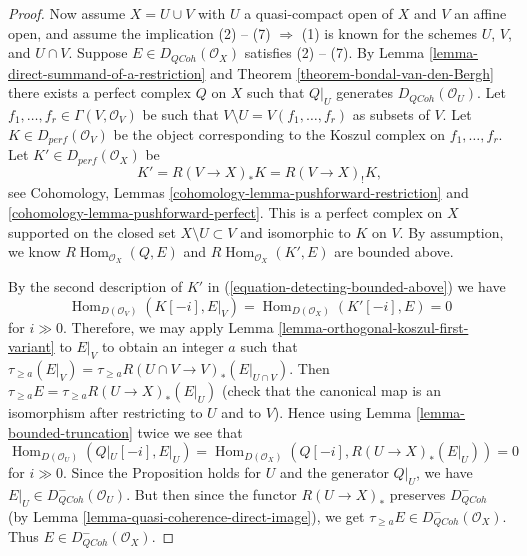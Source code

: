 \documentclass{amsart}
\theoremstyle{plain}
\theoremstyle{definition}
\theoremstyle{remark}
\numberwithin{equation}{subsection}
\def\Hom{\mathop{\mathrm{Hom}}\nolimits}
\def\QCoh{\mathit{QCoh}}
\begin{document}
\begin{proof}
\medskip\noindent
Now assume $X = U \cup V$ with $U$ a quasi-compact open of $X$ and
$V$ an affine open, and assume the implication (2) -- (7) $\Rightarrow$ (1)
is known for the schemes $U$, $V$, and $U \cap V$.
Suppose $E \in D_\QCoh(\mathcal{O}_X)$ satisfies (2) -- (7).
By Lemma \ref{lemma-direct-summand-of-a-restriction} and
Theorem \ref{theorem-bondal-van-den-Bergh} there exists a perfect
complex $Q$ on $X$ such that $Q|_U$ generates $D_\QCoh (\mathcal{O}_U)$. 
Let $f_1, \dots , f_r \in \Gamma (V, \mathcal{O}_V)$
be such that $V \setminus U = V(f_1, \dots , f_r)$ as subsets of
$V$. Let $K \in D_{perf}(\mathcal{O}_V)$ be the object
corresponding to the Koszul complex on $f_1, \dots , f_r$.
Let $K' \in D_{perf}(\mathcal{O}_X)$ be
\begin{equation}
\label{equation-detecting-bounded-above}
K' = R (V \to X)_* K = R (V \to X)_! K,
\end{equation}
see Cohomology, Lemmas \ref{cohomology-lemma-pushforward-restriction} and
\ref{cohomology-lemma-pushforward-perfect}. This is a perfect
complex on $X$ supported on the closed set $X \setminus U \subset V$
and isomorphic to $K$ on $V$. By assumption, we know
$R\Hom_{\mathcal{O}_X}(Q, E)$ and
$R\Hom_{\mathcal{O}_X}(K', E)$ are bounded above.

\medskip\noindent
By the second description of $K'$ in (\ref{equation-detecting-bounded-above})
we have
$$
\Hom_{D(\mathcal{O}_V)}(K[-i], E|_V) = \Hom_{D(\mathcal{O}_X)}(K'[-i], E) = 0
$$
for $i \gg 0$. Therefore, we may apply
Lemma \ref{lemma-orthogonal-koszul-first-variant} to $E|_V$ to
obtain an integer $a$ such that
$\tau_{\geq a}(E|_V) = \tau_{\geq a} R (U \cap V \to V)_* (E|_{U \cap V})$.
Then $\tau_{\geq a} E = \tau_{\geq a} R (U \to X)_* (E |_U)$
(check that the canonical map is an isomorphism after restricting to
$U$ and to $V$). Hence using Lemma \ref{lemma-bounded-truncation}
twice we see that
$$
\Hom_{D(\mathcal{O}_U)}(Q|_U [-i], E|_U) =
\Hom_{D(\mathcal{O}_X)}(Q[-i], R (U \to X)_* (E|_U)) = 0
$$
for $i \gg 0$. Since the Proposition holds for $U$ and the generator
$Q|_U$, we have $E|_U \in D^-_\QCoh(\mathcal{O}_U)$. But then since
the functor $R (U \to X)_*$ preserves $D^-_\QCoh$ 
(by Lemma \ref{lemma-quasi-coherence-direct-image}), we get
$\tau_{\geq a}E \in D^-_\QCoh(\mathcal{O}_X)$. Thus 
$E \in D^-_\QCoh (\mathcal{O}_X)$. 
\end{proof}
\end{document}

